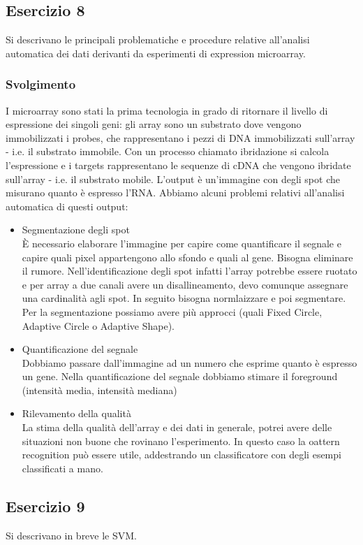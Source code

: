 \documentclass{article}
\begin{document}
\subsection*{Esercizio 8}
Si descrivano le principali problematiche e procedure relative all'analisi automatica dei dati
derivanti da esperimenti di expression microarray.
\subsubsection*{Svolgimento}
I microarray sono stati la prima tecnologia in grado di ritornare il livello di espressione dei singoli geni: gli array sono un substrato dove vengono immobilizzati i probes, che rappresentano i pezzi di DNA immobilizzati sull'array - i.e. il substrato immobile.
Con un processo chiamato ibridazione si calcola l'espressione e i targets rappresentano le sequenze di cDNA che vengono ibridate sull'array - i.e. il substrato mobile. L'output è un'immagine con degli spot che misurano quanto è espresso l'RNA. Abbiamo alcuni problemi relativi all'analisi automatica di questi output:
\begin{itemize}
    \item Segmentazione degli spot\\ È necessario elaborare l'immagine per capire come quantificare il segnale e capire quali pixel appartengono allo sfondo e quali al gene. Bisogna eliminare il rumore. Nell'identificazione degli spot infatti l'array potrebbe essere ruotato e per array
    a due canali avere un disallineamento, devo comunque assegnare una cardinalità agli spot. In seguito bisogna normlaizzare e poi segmentare. Per la segmentazione possiamo avere più approcci (quali Fixed Circle, Adaptive Circle o Adaptive Shape).
    \item Quantificazione del segnale\\ Dobbiamo passare dall'immagine ad un numero che esprime quanto è espresso un gene. Nella quantificazione del segnale dobbiamo stimare il foreground
    (intensità media, intensità mediana)
    \item Rilevamento della qualità\\ La stima della qualità dell'array e dei dati in generale, potrei avere delle situazioni non buone che rovinano l'esperimento. In questo caso la oattern recognition può essere utile, addestrando un classificatore con degli esempi classificati a mano.
\end{itemize}

\subsection*{Esercizio 9}
Si descrivano in breve le SVM.
\end{document}
